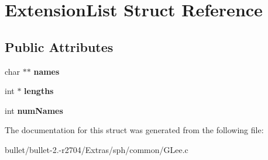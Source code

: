 \hypertarget{struct_extension_list}{\section{Extension\+List Struct Reference}
\label{struct_extension_list}
}
\subsection*{Public Attributes}
\begin{DoxyCompactItemize}
\item 
\hypertarget{struct_extension_list_a4ca8feba3982178f2cfdcc80d3a1bafc}{char $\ast$$\ast$ {\bfseries names}}\label{struct_extension_list_a4ca8feba3982178f2cfdcc80d3a1bafc}

\item 
\hypertarget{struct_extension_list_a187eb145322e0ec04fc4842054037aad}{int $\ast$ {\bfseries lengths}}\label{struct_extension_list_a187eb145322e0ec04fc4842054037aad}

\item 
\hypertarget{struct_extension_list_afbdc52d0b276a429ad3b31c9ba855531}{int {\bfseries num\+Names}}\label{struct_extension_list_afbdc52d0b276a429ad3b31c9ba855531}

\end{DoxyCompactItemize}


The documentation for this struct was generated from the following file\+:\begin{DoxyCompactItemize}
\item 
bullet/bullet-\/2.-\/r2704/\+Extras/sph/common/G\+Lee.\+c\end{DoxyCompactItemize}

